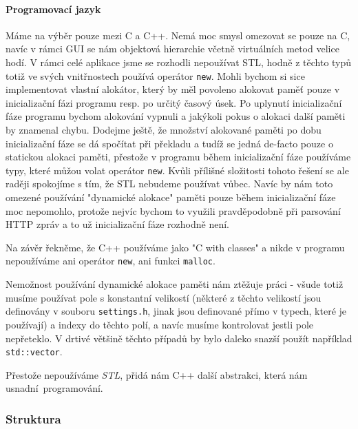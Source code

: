 \paragraph{Programovací jazyk}
Máme na výběr pouze mezi C a C++.
Nemá moc smysl omezovat se pouze na C, navíc v rámci GUI se nám objektová hierarchie včetně
virtuálních metod velice hodí.
V rámci celé aplikace jsme se rozhodli nepoužívat STL, hodně z těchto typů totiž ve svých vnitřnostech
používá operátor \texttt{new}.
Mohli bychom si sice implementovat vlastní alokátor, který by měl povoleno alokovat paměť pouze
v inicializační fázi programu resp. po určitý časový úsek.
Po uplynutí inicializační fáze programu bychom alokování vypnuli a jakýkoli pokus o alokaci další
paměti by znamenal chybu.
Dodejme ještě, že množství alokované paměti po dobu inicializační fáze se dá spočítat při překladu
a tudíž se jedná de-facto pouze o statickou alokaci paměti, přestože v programu během inicializační
fáze používáme typy, které můžou volat operátor \texttt{new}.
Kvůli přílišné složitosti tohoto řešení se ale raději spokojíme s tím, že STL nebudeme používat vůbec.
Navíc by nám toto omezené používání "dynamické alokace" paměti pouze během inicializační fáze
moc nepomohlo, protože nejvíc bychom to využili pravděpodobně při parsování HTTP zpráv a to už
inicializační fáze rozhodně není.

Na závěr řekněme, že C++ používáme jako "C with classes" a nikde v programu nepoužíváme ani operátor
\texttt{new}, ani funkci \texttt{malloc}.

Nemožnost používání dynamické alokace paměti nám ztěžuje práci - všude totiž musíme používat pole s
konstantní velikostí (některé z těchto velikostí jsou definovány v souboru \texttt{settings.h}, jinak
jsou definované přímo v typech, které je používají) a indexy do těchto polí, a navíc musíme kontrolovat
jestli pole nepřeteklo.
V drtivé většině těchto případů by bylo daleko snazší použít například \texttt{std::vector}.

Přestože nepoužíváme \emph{STL}, přidá nám C++ další abstrakci, která nám usnadní~programování.

\subsubsection{Struktura}

